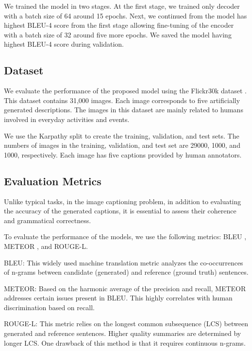 \documentclass[conference]{IEEEtran}
\begin{document}
We trained the model in two stages. At the first stage, we trained only decoder with a batch size of 64 around 15 epochs. Next, we continued from the model has highest BLEU-4 score from the first stage allowing fine-tuning of the encoder with a batch size of 32 around five more epochs. We saved the model having highest BLEU-4 score during validation. 

\subsection{Dataset}
We evaluate the performance of the proposed model using the Flickr30k dataset \cite{jia2015guiding}. This dataset contains 31,000 images. Each image corresponds to five artificially generated descriptions. The images in this dataset are mainly related to humans involved in everyday activities and events.

We use the Karpathy split \cite{karpathy2015deep} to create the training, validation, and test sets. The numbers of images in the training, validation, and test set are 29000, 1000, and 1000, respectively. Each image has five captions provided by human annotators\cite{jia2015guiding}.


\subsection{Evaluation Metrics}
Unlike typical tasks, in the image captioning problem, in addition to evaluating the accuracy of the generated captions, it is essential to assess their coherence and grammatical correctness.


To evaluate the performance of the models, we use the following metrics: BLEU \cite{papineni2002bleu}, METEOR \cite{banerjee2005meteor}, and ROUGE-L.


BLEU: This widely used machine translation metric analyzes the co-occurrences of n-grams between candidate (generated) and reference (ground truth) sentences.


METEOR: Based on the harmonic average of the precision and recall, METEOR addresses certain issues present in BLEU. This highly correlates with human discrimination based on recall.


ROUGE-L: This metric relies on the longest common subsequence (LCS) between generated and reference sentences. Higher quality summaries are determined by longer LCS. One drawback of this method is that it requires continuous n-grams.
\end{document}
